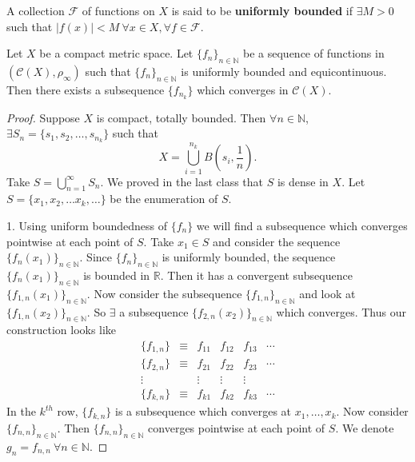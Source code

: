 \documentclass{functionspaces}
\begin{document}
\begin{definition}
A collection $\mathcal{F}$ of functions on $X$ is said to be \textbf{uniformly bounded} if $\exists M > 0$ such that $|f(x)| < M \ \forall x \in X, \forall f \in \mathcal{F}$.
\end{definition}

\begin{theorem}
Let $X$ be a compact metric space. Let $\{f_n\}_{n \in \mathbb{N}}$ be a sequence of functions in $(\mathcal{C}(X), \rho_\infty)$ such that $\{f_n\}_{n \in \mathbb{N}}$ is uniformly bounded and equicontinuous. Then there exists a subsequence $\{f_{n_k}\}$ which converges in $\mathcal{C}(X)$.
\end{theorem}

\begin{proof}
Suppose $X$ is compact, totally bounded. Then $\forall n \in \mathbb{N}$, $\exists S_n = \{s_1, s_2, \ldots, s_{n_k}\}$ such that
\[
X = \bigcup_{i=1}^{n_k} B\left(s_i, \frac{1}{n}\right).
\]
Take $S = \bigcup_{n=1}^\infty S_n$. We proved in the last class that $S$ is dense in $X$. Let $S = \{x_1, x_2, \ldots x_k, \ldots\}$ be the enumeration of $S$.

1. Using uniform boundedness of $\{f_n\}$ we will find a subsequence which converges pointwise at each point of $S$. Take $x_1 \in S$ and consider the sequence $\{f_n(x_1)\}_{n \in \mathbb{N}}$. Since $\{f_n\}_{n \in \mathbb{N}}$ is uniformly bounded, the sequence $\{f_n(x_1)\}_{n \in \mathbb{N}}$ is bounded in $\mathbb{R}$. Then it has a convergent subsequence $\{f_{1,n}(x_1)\}_{n \in \mathbb{N}}$. Now consider the subsequence $\{f_{1,n}\}_{n \in \mathbb{N}}$ and look at $\{f_{1,n}(x_2)\}_{n \in \mathbb{N}}$. So $\exists$ a subsequence $\{f_{2,n}(x_2)\}_{n \in \mathbb{N}}$ which converges. Thus our construction looks like
\[
\begin{array}{rclcrcl}
\{f_{1,n}\} & \equiv & f_{11} & f_{12} & f_{13} & \cdots \\
\{f_{2,n}\} & \equiv & f_{21} & f_{22} & f_{23} & \cdots \\
\vdots & & \vdots & \vdots & \vdots \\
\{f_{k,n}\} & \equiv & f_{k1} & f_{k2} & f_{k3} & \cdots 
\end{array}
\]
In the $k^{th}$ row, $\{f_{k,n}\}$ is a subsequence which converges at $x_1, \ldots, x_k$. Now consider $\{f_{n,n}\}_{n \in \mathbb{N}}$. Then $\{f_{n,n}\}_{n \in \mathbb{N}}$ converges pointwise at each point of $S$. We denote $g_n = f_{n,n} \ \forall n \in \mathbb{N}$.


\end{proof}
\end{document}
